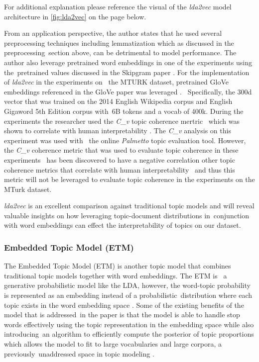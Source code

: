 \documentclass[letterpaper,12pt]{article}
\begin{document}
For additional explanation please reference the visual of the \emph{lda2vec} model architecture in \ref{fig:lda2vec} \cite{moody2016mixing} on the page below.


\newpage
From an application perspective, the author states that he used several preprocessing techniques including lemmatization which as discussed in the preprocessing\
section above, can be detrimental to model performance. The author also leverage pretrained word embeddings in one of the experiments using the\
pretrained values discussed in the Skipgram paper \cite{mikolov2013distributed}. For the implementation of \emph{lda2vec} in the experiments on \
the MTURK dataset, pretrained GloVe embeddings referenced in the GloVe paper was leveraged \cite{pennington2014glove}. \
Specifically, the 300d vector that was trained on the 2014 English Wikipedia corpus and English Gigaword 5th Edition corpus with\
6B tokens and a vocab of 400k.
During the experiments the researcher used the \emph{C\_v} topic coherence mertric \
which was shown to correlate with human interpretability \cite{roder2015exploring}. The \emph{C\_v} analysis on this experiment was used with \
the online \emph{Palmetto} \cite{palmetto} topic evaluation tool. However, the \emph{C\_v} coherence metric that was used to evaluate topic coherence in these experiments \
has been discovered to have a negative correlation other topic coherence metrics \cite{palmetto} that correlate with human interpretability \cite{mimno2011optimizing} \cite{newman2010automatic}\
and thus this metric will not be leveraged to evaluate topic coherence in the experiments on the MTurk dataset.

\emph{lda2vec} is an excellent comparison against traditional topic models and will reveal valuable insights on how leveraging topic-document distributions in\
conjunction with word embeddings can effect the interpretability of topics on our dataset.

\subsubsection{Embedded Topic Model (ETM)}
The Embedded Topic Model (ETM) is another topic model that combines traditional topic models together with word embeddings. The ETM is \
a generative probabilistic model like the LDA, however, the word-topic probability is represented as an embedding instead of a probabilistic\
distribution where each topic exists in the word embedding space \cite{dieng2019topic}. Some of the existing benefits of the model that is addressed\
in the paper is that the model is able to handle stop words effectively using the topic representation in the embedding space while also introducing\
an algorithm to efficiently compute the posterior of topic proportions which allows the model to fit to large vocabularies and large corpora, a previously\
unaddressed space in topic modeling \cite{dieng2019topic}.
\end{document}
